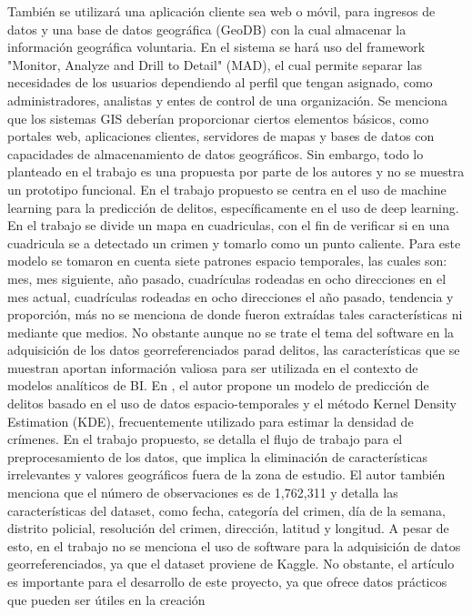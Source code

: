 También se utilizará una aplicación cliente sea web o móvil, para ingresos de datos y una base de datos geográfica (GeoDB) con
la cual almacenar la información geográfica voluntaria. En el sistema se hará uso del framework "Monitor, Analyze and Drill to Detail"
(MAD), el cual permite separar las necesidades de los usuarios dependiendo al perfil que tengan asignado, como administradores,
analistas y entes de control de una organización. Se menciona que los sistemas GIS deberían proporcionar ciertos elementos básicos,
como portales web, aplicaciones clientes, servidores de mapas y bases de datos con capacidades de almacenamiento de datos geográficos.
Sin embargo, todo lo planteado en el trabajo es una propuesta por parte de los autores y no se muestra un prototipo funcional.
\bigbreak
En \cite{linUsingMachineLearning2017} el trabajo propuesto se centra en el uso de machine learning para la predicción de delitos,
específicamente en el uso de deep learning. En el trabajo se divide un mapa en cuadriculas, con el fin de verificar si en una cuadricula
se a detectado un crimen y tomarlo como un punto caliente. Para este modelo se tomaron en cuenta siete patrones espacio temporales,
las cuales son: mes, mes siguiente, año pasado, cuadrículas rodeadas en ocho direcciones en el mes actual, cuadrículas rodeadas en
ocho direcciones el año pasado, tendencia y proporción, más no se menciona de donde fueron extraídas tales características ni mediante
que medios. No obstante aunque no se trate el tema del software en la adquisición de los datos georreferenciados parad delitos, las
características que se muestran aportan información valiosa para ser utilizada en el contexto de modelos analíticos de BI.
\bigbreak
En \cite{CrimesPredictionUsing2019}, el autor propone un modelo de predicción de delitos basado en el uso de datos espacio-temporales
y el método Kernel Density Estimation (KDE), frecuentemente utilizado para estimar la densidad de crímenes. En el trabajo propuesto,
se detalla el flujo de trabajo para el preprocesamiento de los datos, que implica la eliminación de características irrelevantes y valores
geográficos fuera de la zona de estudio. El autor también menciona que el número de observaciones es de 1,762,311 y detalla las características
del dataset, como fecha, categoría del crimen, día de la semana, distrito policial, resolución del crimen, dirección, latitud y longitud.
A pesar de esto, en el trabajo no se menciona el uso de software para la adquisición de datos georreferenciados, ya que el dataset proviene de Kaggle.
No obstante, el artículo es importante para el desarrollo de este proyecto, ya que ofrece datos prácticos que pueden ser útiles en la creación

